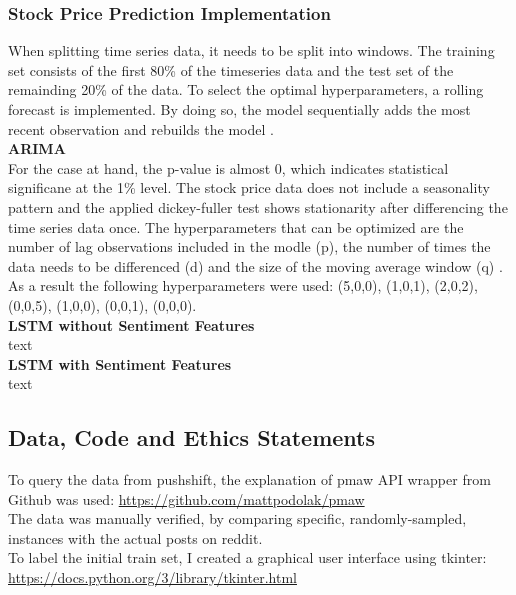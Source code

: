\documentclass[11pt, a4paper]{article}
\begin{document}
\subsubsection{Stock Price Prediction Implementation}
When splitting time series data, it needs to be split into windows. The training set consists of the first 80\% of the timeseries data and
the test set of the remainding 20\% of the data. To select the optimal hyperparameters, a rolling forecast is implemented. By doing so, the model 
sequentially adds the most recent observation and rebuilds the model \citep{sima2018timeseries}.\\

\noindent\textbf{ARIMA}\\
For the case at hand, the p-value is almost 0, which indicates statistical significane at the 1\% level. The stock price data does not include a seasonality pattern
and the applied dickey-fuller test shows stationarity after differencing the time series data once. The hyperparameters that can be optimized are the number of lag observations
included in the modle (p), the number of times the data needs to be differenced (d) and the size of the moving average window (q) \citep{sima2018timeseries}. As a result the following
hyperparameters were used: (5,0,0), (1,0,1), (2,0,2), (0,0,5), (1,0,0), (0,0,1), (0,0,0). \\

\noindent\textbf{LSTM without Sentiment Features}\\
text\\

\noindent\textbf{LSTM with Sentiment Features}\\
text\\

\subsection{Data, Code and Ethics Statements} \label{datacodeethics}
To query the data from pushshift, the explanation of pmaw API wrapper from Github was used: \url{https://github.com/mattpodolak/pmaw}\\
The data was manually verified, by comparing specific, randomly-sampled, instances with the actual posts on reddit.\\

\noindent To label the initial train set, I created a graphical user interface using tkinter: \url{https://docs.python.org/3/library/tkinter.html}\\
\end{document}
